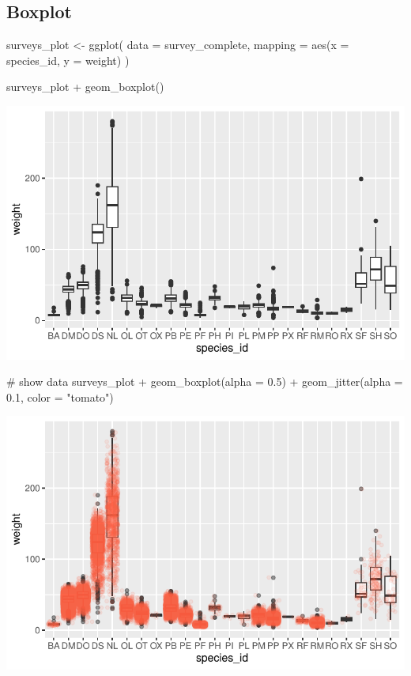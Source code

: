 \documentclass[
  letterpaper,
  DIV=11,
  numbers=noendperiod]{scrreprt}
\newenvironment{Shaded}{\begin{snugshade}}{\end{snugshade}}
\newcommand{\AttributeTok}[1]{\textcolor[rgb]{0.40,0.45,0.13}{#1}}
\newcommand{\CommentTok}[1]{\textcolor[rgb]{0.37,0.37,0.37}{#1}}
\newcommand{\FloatTok}[1]{\textcolor[rgb]{0.68,0.00,0.00}{#1}}
\newcommand{\FunctionTok}[1]{\textcolor[rgb]{0.28,0.35,0.67}{#1}}
\newcommand{\NormalTok}[1]{\textcolor[rgb]{0.00,0.23,0.31}{#1}}
\newcommand{\OtherTok}[1]{\textcolor[rgb]{0.00,0.23,0.31}{#1}}
\newcommand{\SpecialCharTok}[1]{\textcolor[rgb]{0.37,0.37,0.37}{#1}}
\newcommand{\StringTok}[1]{\textcolor[rgb]{0.13,0.47,0.30}{#1}}
\begin{document}
\subsection{Boxplot}\label{boxplot}

\begin{Shaded}
\begin{Highlighting}[]
\NormalTok{surveys\_plot }\OtherTok{\textless{}{-}} \FunctionTok{ggplot}\NormalTok{(}
  \AttributeTok{data =}\NormalTok{ survey\_complete,}
  \AttributeTok{mapping =} \FunctionTok{aes}\NormalTok{(}\AttributeTok{x =}\NormalTok{ species\_id, }\AttributeTok{y =}\NormalTok{ weight)}
\NormalTok{)}

\NormalTok{surveys\_plot }\SpecialCharTok{+} \FunctionTok{geom\_boxplot}\NormalTok{()}
\end{Highlighting}
\end{Shaded}

\includegraphics{src/notebooks/r_files/figure-pdf/unnamed-chunk-46-1.pdf}

\begin{Shaded}
\begin{Highlighting}[]
\CommentTok{\# show data}
\NormalTok{surveys\_plot }\SpecialCharTok{+} \FunctionTok{geom\_boxplot}\NormalTok{(}\AttributeTok{alpha =} \FloatTok{0.5}\NormalTok{) }\SpecialCharTok{+}
  \FunctionTok{geom\_jitter}\NormalTok{(}\AttributeTok{alpha =} \FloatTok{0.1}\NormalTok{, }\AttributeTok{color =} \StringTok{"tomato"}\NormalTok{)}
\end{Highlighting}
\end{Shaded}

\includegraphics{src/notebooks/r_files/figure-pdf/unnamed-chunk-46-2.pdf}
\end{document}
